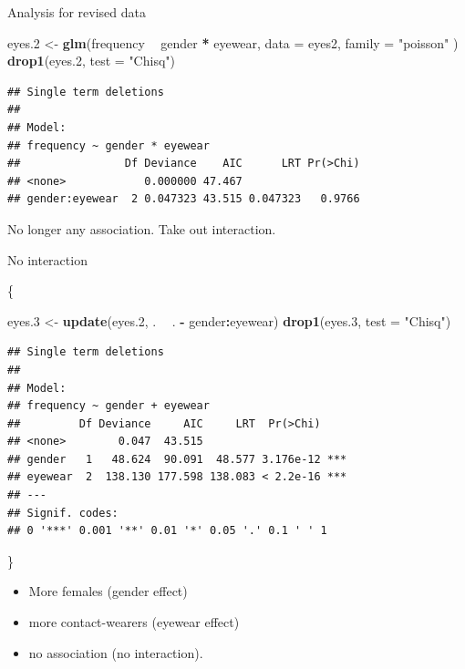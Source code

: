 \documentclass[ignorenonframetext,]{beamer}
\newenvironment{Shaded}{\begin{snugshade}}{\end{snugshade}}
\newcommand{\DataTypeTok}[1]{\textcolor[rgb]{0.13,0.29,0.53}{#1}}
\newcommand{\FloatTok}[1]{\textcolor[rgb]{0.00,0.00,0.81}{#1}}
\newcommand{\KeywordTok}[1]{\textcolor[rgb]{0.13,0.29,0.53}{\textbf{#1}}}
\newcommand{\NormalTok}[1]{#1}
\newcommand{\OperatorTok}[1]{\textcolor[rgb]{0.81,0.36,0.00}{\textbf{#1}}}
\newcommand{\StringTok}[1]{\textcolor[rgb]{0.31,0.60,0.02}{#1}}
\begin{document}
\begin{frame}[fragile]{Analysis for revised data}
\protect\hypertarget{analysis-for-revised-data}{}

\begin{Shaded}
\begin{Highlighting}[]
\NormalTok{eyes}\FloatTok{.2}\NormalTok{ <-}\StringTok{ }\KeywordTok{glm}\NormalTok{(frequency }\OperatorTok{~}\StringTok{ }\NormalTok{gender }\OperatorTok{*}\StringTok{ }\NormalTok{eyewear,}
  \DataTypeTok{data =}\NormalTok{ eyes2,}
  \DataTypeTok{family =} \StringTok{"poisson"}
\NormalTok{)}
\KeywordTok{drop1}\NormalTok{(eyes}\FloatTok{.2}\NormalTok{, }\DataTypeTok{test =} \StringTok{"Chisq"}\NormalTok{)}
\end{Highlighting}
\end{Shaded}

\begin{verbatim}
## Single term deletions
## 
## Model:
## frequency ~ gender * eyewear
##                Df Deviance    AIC      LRT Pr(>Chi)
## <none>            0.000000 47.467                  
## gender:eyewear  2 0.047323 43.515 0.047323   0.9766
\end{verbatim}

No longer any association. Take out interaction.

\end{frame}

\begin{frame}[fragile]{No interaction}
\protect\hypertarget{no-interaction}{}

\{\small

\begin{Shaded}
\begin{Highlighting}[]
\NormalTok{eyes}\FloatTok{.3}\NormalTok{ <-}\StringTok{ }\KeywordTok{update}\NormalTok{(eyes}\FloatTok{.2}\NormalTok{, . }\OperatorTok{~}\StringTok{ }\NormalTok{. }\OperatorTok{-}\StringTok{ }\NormalTok{gender}\OperatorTok{:}\NormalTok{eyewear)}
\KeywordTok{drop1}\NormalTok{(eyes}\FloatTok{.3}\NormalTok{, }\DataTypeTok{test =} \StringTok{"Chisq"}\NormalTok{)}
\end{Highlighting}
\end{Shaded}

\begin{verbatim}
## Single term deletions
## 
## Model:
## frequency ~ gender + eyewear
##         Df Deviance     AIC     LRT  Pr(>Chi)    
## <none>        0.047  43.515                      
## gender   1   48.624  90.091  48.577 3.176e-12 ***
## eyewear  2  138.130 177.598 138.083 < 2.2e-16 ***
## ---
## Signif. codes:  
## 0 '***' 0.001 '**' 0.01 '*' 0.05 '.' 0.1 ' ' 1
\end{verbatim}

\}

\begin{itemize}
\item
  More females (gender effect)
\item
  more contact-wearers (eyewear effect)
\item
  no association (no interaction).
\end{itemize}

\end{frame}
\end{document}
